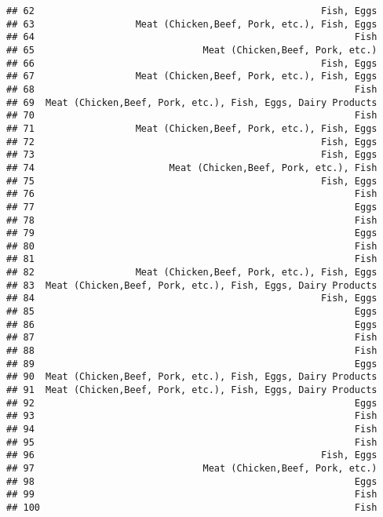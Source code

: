 \documentclass[
]{article}
\begin{document}
\begin{verbatim}
## 62                                                   Fish, Eggs
## 63                  Meat (Chicken,Beef, Pork, etc.), Fish, Eggs
## 64                                                         Fish
## 65                              Meat (Chicken,Beef, Pork, etc.)
## 66                                                   Fish, Eggs
## 67                  Meat (Chicken,Beef, Pork, etc.), Fish, Eggs
## 68                                                         Fish
## 69  Meat (Chicken,Beef, Pork, etc.), Fish, Eggs, Dairy Products
## 70                                                         Fish
## 71                  Meat (Chicken,Beef, Pork, etc.), Fish, Eggs
## 72                                                   Fish, Eggs
## 73                                                   Fish, Eggs
## 74                        Meat (Chicken,Beef, Pork, etc.), Fish
## 75                                                   Fish, Eggs
## 76                                                         Fish
## 77                                                         Eggs
## 78                                                         Fish
## 79                                                         Eggs
## 80                                                         Fish
## 81                                                         Fish
## 82                  Meat (Chicken,Beef, Pork, etc.), Fish, Eggs
## 83  Meat (Chicken,Beef, Pork, etc.), Fish, Eggs, Dairy Products
## 84                                                   Fish, Eggs
## 85                                                         Eggs
## 86                                                         Eggs
## 87                                                         Fish
## 88                                                         Fish
## 89                                                         Eggs
## 90  Meat (Chicken,Beef, Pork, etc.), Fish, Eggs, Dairy Products
## 91  Meat (Chicken,Beef, Pork, etc.), Fish, Eggs, Dairy Products
## 92                                                         Eggs
## 93                                                         Fish
## 94                                                         Fish
## 95                                                         Fish
## 96                                                   Fish, Eggs
## 97                              Meat (Chicken,Beef, Pork, etc.)
## 98                                                         Eggs
## 99                                                         Fish
## 100                                                        Fish

\end{verbatim}
\end{document}
